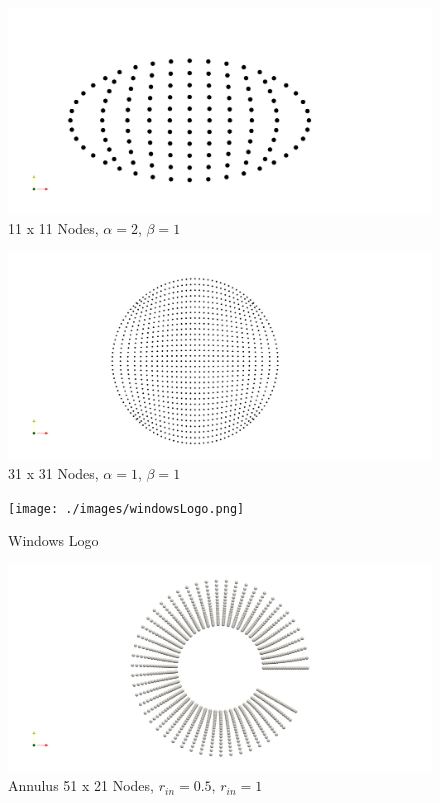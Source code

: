 \documentclass{article}
\begin{document}
 	\newpage
 	
 	\begin{figure}[H]
		\includegraphics[height=1.0\textheight, width=1.05\textwidth, keepaspectratio]{./images/ellipse_21_21_1_2.png}
		\caption{11 x 11 Nodes, $\alpha = 2$, $\beta = 1$}
		\label{ellipse]}
 	\end{figure}
 	
 	\begin{figure}[H]
 		\includegraphics[height=1.0\textheight, width=1.05\textwidth, keepaspectratio]{./images/circle_1_1_31_31.png}
 		\caption{31 x 31 Nodes, $\alpha = 1$, $\beta = 1$}
 		\label{cicle}
	\end{figure}

	\newpage
	
 	\begin{figure}[H]
	\texttt{[image: ./images/windowsLogo.png]}
	\caption{Windows Logo}
	\label{win}
	\end{figure}

 	\begin{figure}[H]
		\includegraphics[height=1.0\textheight, width=1.05\textwidth, keepaspectratio]{./images/c_51_21.png}
		\caption{Annulus 51 x 21 Nodes, $r_{in} = 0.5$, $r_{in} = 1$}
		\label{c}
	\end{figure}
 	
 	
 	
 
	
	
	
\end{document}
